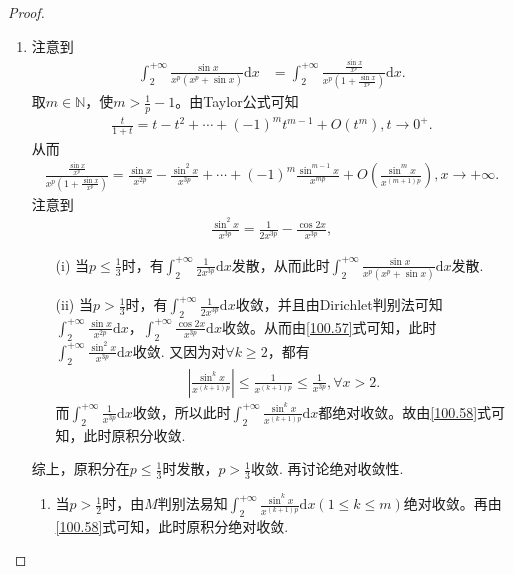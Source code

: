 \documentclass[../../main.tex]{subfiles}
\begin{document}
\begin{proof}
\begin{enumerate}
\item 注意到
\begin{align*}
\int_{2}^{+\infty}\frac{\sin x}{x^p(x^p + \sin x)}\mathrm{d}x&=\int_{2}^{+\infty}\frac{\frac{\sin x}{x^p}}{x^p(1 + \frac{\sin x}{x^p})}\mathrm{d}x.
\end{align*}
取\(m\in \mathbb{N}\)，使\(m > \frac{1}{p}-1\)。由Taylor公式可知
\begin{align*}
\frac{t}{1 + t}=t - t^2+\cdots + (-1)^mt^{m - 1}+O(t^m),t\rightarrow 0^+.
\end{align*}
从而
\begin{align}
\frac{\frac{\sin x}{x^p}}{x^p(1 + \frac{\sin x}{x^p})}=\frac{\sin x}{x^{2p}}-\frac{\sin^2 x}{x^{3p}}+\cdots + (-1)^m\frac{\sin^{m - 1} x}{x^{mp}}+O\left(\frac{\sin^m x}{x^{(m + 1)p}}\right),x\rightarrow +\infty. \label{100.58}
\end{align}
注意到
\begin{align}
\frac{\sin^2 x}{x^{3p}}=\frac{1}{2x^{3p}}-\frac{\cos 2x}{x^{3p}}, \label{100.57}
\end{align}
\begin{enumerate}
\item[(i)] 当\(p\leqslant \frac{1}{3}\)时，有\(\int_{2}^{+\infty}\frac{1}{2x^{3p}}\mathrm{d}x\)发散，从而此时\(\int_{2}^{+\infty}\frac{\sin x}{x^p(x^p + \sin x)}\mathrm{d}x\)发散.
\item[(ii)] 当\(p > \frac{1}{3}\)时，有\(\int_{2}^{+\infty}\frac{1}{2x^{3p}}\mathrm{d}x\)收敛，并且由Dirichlet判别法可知\(\int_{2}^{+\infty}\frac{\sin x}{x^{2p}}\mathrm{d}x\)，\(\int_{2}^{+\infty}\frac{\cos 2x}{x^{3p}}\mathrm{d}x\)收敛。从而由\eqref{100.57}式可知，此时\(\int_{2}^{+\infty}\frac{\sin^2 x}{x^{3p}}\mathrm{d}x\)收敛.
又因为对\(\forall k\geqslant 2\)，都有
\begin{align*}
\left|\frac{\sin^k x}{x^{(k + 1)p}}\right|\leqslant\frac{1}{x^{(k + 1)p}}\leqslant\frac{1}{x^{3p}},\forall x > 2.
\end{align*}
而\(\int_{2}^{+\infty}\frac{1}{x^{3p}}\mathrm{d}x\)收敛，所以此时\(\int_{2}^{+\infty}\frac{\sin^k x}{x^{(k + 1)p}}\mathrm{d}x\)都绝对收敛。故由\eqref{100.58}式可知，此时原积分收敛.
\end{enumerate}
综上，原积分在\(p\leqslant \frac{1}{3}\)时发散，\(p > \frac{1}{3}\)收敛.
再讨论绝对收敛性.
\begin{enumerate}
\item 当\(p > \frac{1}{2}\)时，由$M$判别法易知\(\int_{2}^{+\infty}\frac{\sin^k x}{x^{(k + 1)p}}\mathrm{d}x(1\leq k\leq m)\)绝对收敛。再由\eqref{100.58}式可知，此时原积分绝对收敛.

\end{enumerate}
\end{enumerate}
\end{proof}
\end{document}
